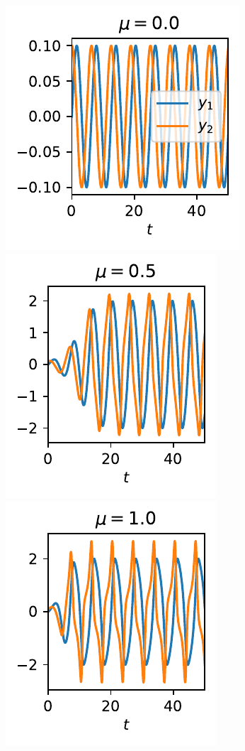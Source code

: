 \begin{figure}[h]
    \centering
    \begin{subfigure}[b]{\textwidth}
        \centering
	\includegraphics{images/vdp_timeplot_mu_00.pdf}
	\includegraphics{images/vdp_timeplot_mu_05.pdf}
	\includegraphics{images/vdp_timeplot_mu_10.pdf}

\end{subfigure}
\end{figure}
